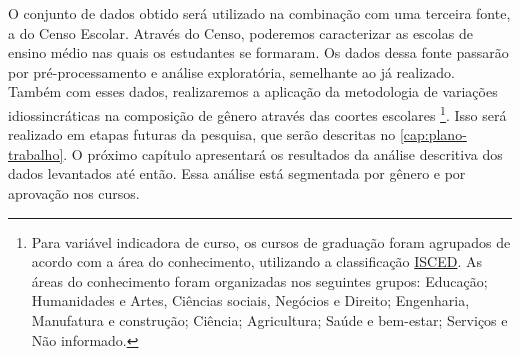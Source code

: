 O conjunto de dados obtido será utilizado na combinação com uma terceira fonte, a do Censo Escolar. Através do Censo, poderemos caracterizar as escolas de ensino médio nas quais os estudantes se formaram. Os dados dessa fonte passarão por pré-processamento e análise exploratória, semelhante ao já realizado. Também com esses dados, realizaremos a aplicação da metodologia de variações idiossincráticas na composição de gênero através das coortes escolares \footnote{Para variável indicadora de curso, os cursos de graduação foram agrupados de acordo com a área do conhecimento, utilizando a classificação 
\href{https://uis.unesco.org/sites/default/files/documents/international-standard-classification-of-education-isced-2011-en.pdf}{ISCED}. As áreas do conhecimento foram organizadas nos seguintes grupos: Educação; Humanidades e Artes, Ciências sociais, Negócios e Direito; Engenharia, Manufatura e construção; Ciência; Agricultura; Saúde e bem-estar; Serviços e Não informado.}. Isso será realizado em etapas futuras da pesquisa, que serão descritas no \autoref{cap:plano-trabalho}. O próximo capítulo apresentará os resultados da análise descritiva dos dados levantados até então. Essa análise está segmentada por gênero e por aprovação nos cursos.